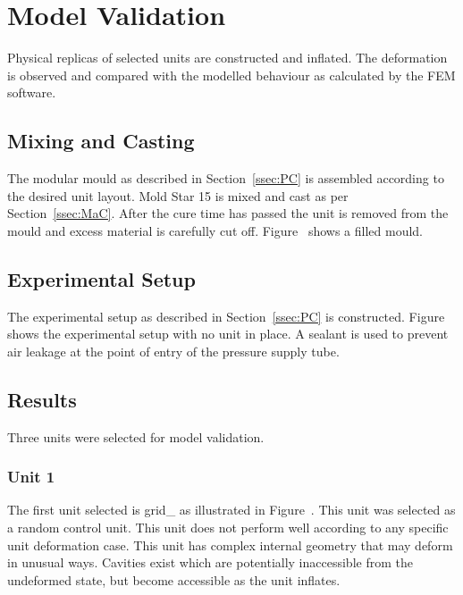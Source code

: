 \chapter{Model Validation}
\label{chp:MV}


Physical replicas of selected units are constructed and inflated. The deformation is observed and compared with the modelled behaviour as calculated by the FEM software.

\section{Mixing and Casting}

The modular mould as described in Section~\ref{ssec:PC} is assembled according to the desired unit layout. Mold Star 15 is mixed and cast as per Section~\ref{ssec:MaC}. After the cure time has passed the unit is removed from the mould and excess material is carefully cut off. Figure~ shows a filled mould.

\section{Experimental Setup}

The experimental setup as described in Section~\ref{ssec:PC} is constructed. Figure~ shows the experimental setup with no unit in place. A sealant is used to prevent air leakage at the point of entry of the pressure supply tube.

\section{Results}

Three units were selected for model validation.

\subsection{Unit 1}

The first unit selected is grid\_ as illustrated in Figure~. This unit was selected as a random control unit. This unit does not perform well according to any specific unit deformation case. This unit has complex internal geometry that may deform in unusual ways. Cavities exist which are potentially inaccessible from the undeformed state, but become accessible as the unit inflates.

